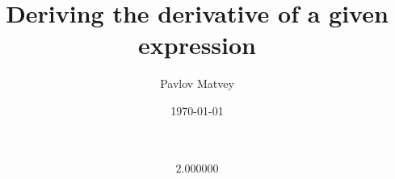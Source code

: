 \documentclass[12pt, letterpaper]{article}
\title {Deriving the derivative of a given expression}
\author{Pavlov Matvey}
\date{\today}
\begin{document}
\maketitle
\[2.000000\]
\end{document}
